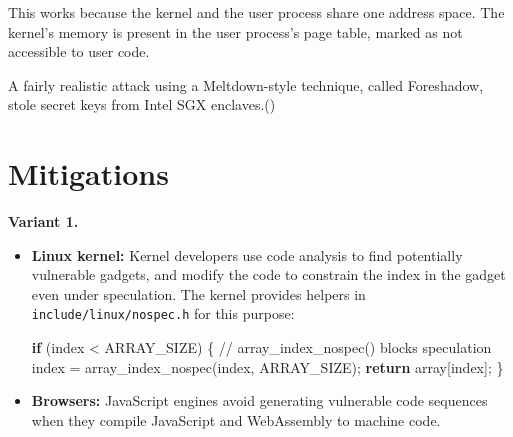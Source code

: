 \documentclass[
  letterpaper,
]{scrbook}
\newenvironment{Shaded}{\begin{snugshade}}{\end{snugshade}}
\newcommand{\CommentTok}[1]{\textcolor[rgb]{0.37,0.37,0.37}{#1}}
\newcommand{\ControlFlowTok}[1]{\textcolor[rgb]{0.00,0.23,0.31}{\textbf{#1}}}
\newcommand{\NormalTok}[1]{\textcolor[rgb]{0.00,0.23,0.31}{#1}}
\newcommand{\OperatorTok}[1]{\textcolor[rgb]{0.37,0.37,0.37}{#1}}
\theoremstyle{definition}
\theoremstyle{plain}
\theoremstyle{plain}
\theoremstyle{remark}
\begin{document}
This works because the kernel and the user process share one address
space. The kernel's memory is present in the user process's page table,
marked as not accessible to user code.
{}

A fairly realistic attack using a Meltdown-style technique, called
Foreshadow, stole secret keys from Intel SGX
enclaves.()

\chapter{Mitigations}\label{sec-sc-mitigations}

\textbf{Variant 1.}

\begin{itemize}
\item
  \textbf{Linux kernel:} Kernel developers use code analysis to find
  potentially vulnerable gadgets, and modify the code to constrain the
  index in the gadget even under speculation. The kernel provides
  helpers in \texttt{include/linux/nospec.h} for this purpose:
  {}

\begin{Shaded}
\begin{Highlighting}[]
\ControlFlowTok{if} \OperatorTok{(}\NormalTok{index }\OperatorTok{\textless{}}\NormalTok{ ARRAY\_SIZE}\OperatorTok{)} \OperatorTok{\{}
    \CommentTok{// array\_index\_nospec() blocks speculation}
\NormalTok{    index }\OperatorTok{=}\NormalTok{ array\_index\_nospec}\OperatorTok{(}\NormalTok{index}\OperatorTok{,}\NormalTok{ ARRAY\_SIZE}\OperatorTok{);}
    \ControlFlowTok{return}\NormalTok{ array}\OperatorTok{[}\NormalTok{index}\OperatorTok{];}
\OperatorTok{\}}
\end{Highlighting}
\end{Shaded}
\item
  \textbf{Browsers:} JavaScript engines avoid generating vulnerable code
  sequences when they compile JavaScript and WebAssembly to machine
  code.
\end{itemize}
\end{document}
